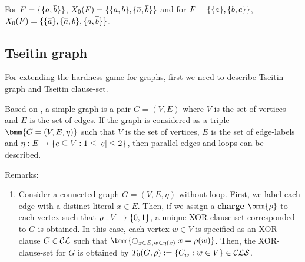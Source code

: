 \documentclass{report}
\begin{document}
\begin{examp}\label{exp:X0}
For $F=\{ \{ a,\overline b \} \}$, $X_0(F)= \{ \{ a,b \},\{ \overline a,\overline b \} \}$ and for $F=\{ \{ a \},\{ b,c \} \}$, $X_0(F)=\{ \{ \overline a \},\{ \overline a, b \}, \{ a, \overline b \} \}$.
\end{examp}
\subsection{Tseitin graph}
\label{sec:Tseitin graph}

For extending the hardness game for graphs, first we need to describe Tseitin graph and Tseitin clause-set. 
\begin{defi}\label{def:graph}
Based on \cite{GwynneKullmann2013GoodRepresentationsIIex}, a simple graph is a pair $G = (V,E)$ where $V$ is the set of vertices and $E$ is the set of edges. If the graph is considered as a triple $\bmm{G = (V,E,\eta)}$ such that $V$ is the set of vertices, $E$ is the set of edge-labels and $\eta: E \rightarrow \{ e \subseteq V : 1 \le \lvert e \rvert \le 2 \}$, then parallel edges and loops can be described. 
\end{defi}
Remarks:
  \begin{enumerate}
  \item Consider a connected graph $G=(V,E,\eta)$ without loop. First, we label each edge with a distinct literal $x \in E$. Then, if we assign a \textbf{charge} $\bmm{\rho}$ to each vertex such that $\rho: V \rightarrow \{ 0,1 \}$, a unique XOR-clause-set corresponded to $G$ is obtained. In this case, each vertex $w \in V$ is specified as an XOR-clause $C \in \mathcal{CL}$ such that $\bmm{\oplus_{x \in E, w \in \eta(x)} \; x = \rho(w)}$. Then, the XOR-clause-set for $G$ is obtained by $T_0(G,\rho) := \{ C_w : w \in V \} \in \mathcal{CLS}$. 
  \end{enumerate}
\end{document}
